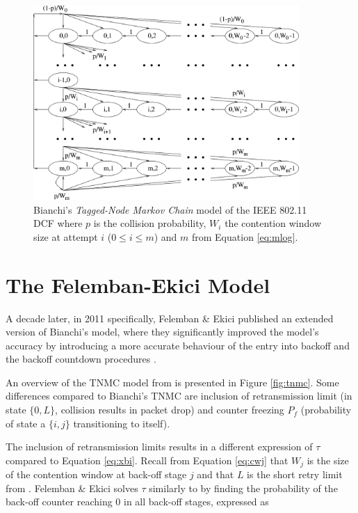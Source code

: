 \begin{figure}
\center
\includegraphics[width=0.9\textwidth]{images/bianchi-model.png}
\caption{Bianchi's \emph{Tagged-Node Markov Chain} model of the IEEE 802.11 DCF where $p$ is the collision probability, $W_i$ the contention window size at attempt $i$ ($0 \leq i \leq m$) and $m$ from Equation \ref{eq:mlog}.}
\label{fig:btnmc}
\end{figure}

\section{The Felemban-Ekici Model}

A decade later, in 2011 specifically, Felemban \& Ekici published an extended
version of Bianchi's model, where they significantly improved the model's
accuracy by introducing a more accurate behaviour of the entry into backoff
and the backoff countdown procedures \cite{felemban}.

An overview of the TNMC model from \cite{felemban} is presented in Figure
\ref{fig:tnmc}. Some differences compared to Bianchi's TNMC are inclusion of
retransmission limit (in state $\{0,L\}$, collision results in packet drop)
and counter freezing $P_f$ (probability of state a $\{i,j\}$ transitioning to itself).

The inclusion of retransmission limits results in a different expression of
$\tau$ compared to Equation \ref{eq:xbi}. Recall from Equation \ref{eq:cwj}
that $W_j$ is the size of the contention window at back-off stage $j$ and that
$L$ is the short retry limit from \cite{654749}. Felemban \& Ekici solves
$\tau$ similarly to \cite{bianchi} by finding the probability of the back-off
counter reaching 0 in all back-off stages, expressed as

